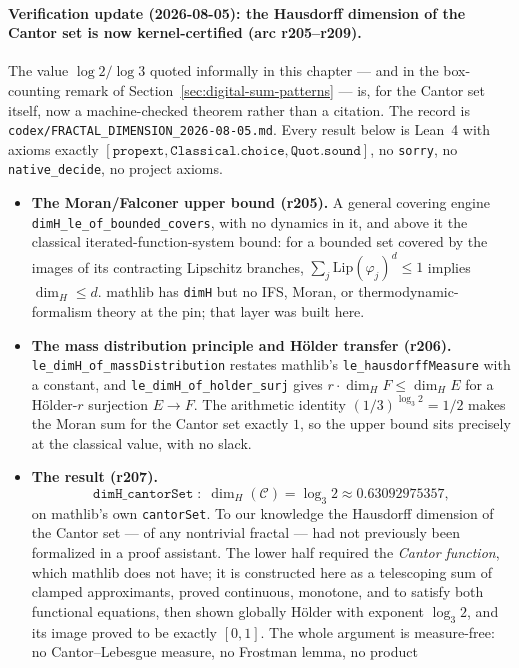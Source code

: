 \paragraph{Verification update (2026-08-05): the Hausdorff dimension of the
Cantor set is now kernel-certified (arc r205--r209).}
The value $\log 2/\log 3$ quoted informally in this chapter --- and in the
box-counting remark of Section~\ref{sec:digital-sum-patterns} --- is, for the Cantor
set itself, now a machine-checked theorem rather than a citation. The record
is \texttt{codex/FRACTAL\_DIMENSION\_2026-08-05.md}. Every result below is
Lean~4 with axioms exactly $[\texttt{propext}, \texttt{Classical.choice},
\texttt{Quot.sound}]$, no \texttt{sorry}, no \texttt{native\_decide}, no
project axioms.

\begin{itemize}
\item \textbf{The Moran/Falconer upper bound (r205).} A general covering
engine \texttt{dimH\_le\_of\_bounded\_covers}, with no dynamics in it, and
above it the classical iterated-function-system bound: for a bounded set
covered by the images of its contracting Lipschitz branches,
$\sum_j \mathrm{Lip}(\varphi_j)^d \le 1$ implies $\dim_H \le d$. mathlib has
\texttt{dimH} but no IFS, Moran, or thermodynamic-formalism theory at the pin;
that layer was built here.
\item \textbf{The mass distribution principle and H\"older transfer (r206).}
\texttt{le\_dimH\_of\_massDistribution} restates mathlib's
\texttt{le\_hausdorffMeasure} with a constant, and
\texttt{le\_dimH\_of\_holder\_surj} gives $r \cdot \dim_H F \le \dim_H E$ for a
H\"older-$r$ surjection $E \to F$. The arithmetic identity
$(1/3)^{\log_3 2} = 1/2$ makes the Moran sum for the Cantor set exactly $1$,
so the upper bound sits precisely at the classical value, with no slack.
\item \textbf{The result (r207).}
\[
\texttt{dimH\_cantorSet} \;:\; \dim_H(\mathcal{C}) = \log_3 2
\approx 0.63092975357,
\]
on mathlib's own \texttt{cantorSet}. To our knowledge the Hausdorff dimension
of the Cantor set --- of any nontrivial fractal --- had not previously been
formalized in a proof assistant. The lower half required the \emph{Cantor
function}, which mathlib does not have; it is constructed here as a
telescoping sum of clamped approximants, proved continuous, monotone, and to
satisfy both functional equations, then shown globally H\"older with exponent
$\log_3 2$, and its image proved to be exactly $[0,1]$. The whole argument is
measure-free: no Cantor--Lebesgue measure, no Frostman lemma, no product

\end{itemize}
